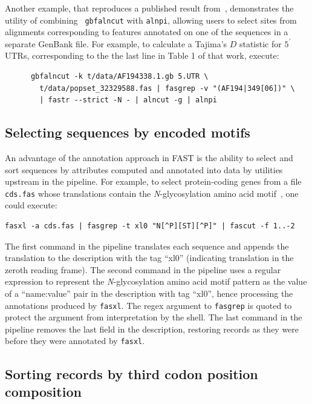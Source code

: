 \documentclass{frontiersSCNS} %
\newcommand{\fp}{$5^\prime${ }}
\begin{document}
Another example, that reproduces a published result
from~\citep{Ardell03}, demonstrates the utility of combining {\tt
  gbfalncut} with {\tt alnpi}, allowing users to select sites from
alignments corresponding to features annotated on one of the sequences
in a separate GenBank file. For example, to calculate a Tajima's $D$
statistic for \fp UTRs, corresponding to the the last line in Table 1
of that work, execute:

\begin{verbatim}
      gbfalncut -k t/data/AF194338.1.gb 5.UTR \
        t/data/popset_32329588.fas | fasgrep -v "(AF194|349[06])" \
        | fastr --strict -N - | alncut -g | alnpi
\end{verbatim}

\subsection{Selecting sequences by encoded motifs }

An advantage of the annotation approach in FAST is the ability to
select and sort sequences by attributes computed and annotated into
data by utilities upstream in the pipeline. For example, to select
protein-coding genes from a file {\tt cds.fas} whose translations
contain the {\it N}-glycosylation amino acid
motif~\citep{KornfieldKornfield85}, one could execute:

\begin{verbatim}
fasxl -a cds.fas | fasgrep -t xl0 "N[^P][ST][^P]" | fascut -f 1..-2
\end{verbatim}
 
The first command in the pipeline translates each sequence and appends
the translation to the description with the tag ``xl0'' (indicating
translation in the zeroth reading frame). The second command in the
pipeline uses a regular expression to represent the {\it
  N}-glycosylation amino acid motif pattern as the value of a
``name:value'' pair in the description with tag ``xl0'', hence
processing the annotations produced by {\tt fasxl}. The regex argument
to {\tt fasgrep} is quoted to protect the argument from interpretation
by the shell. The last command in the pipeline removes the last field
in the description, restoring records as they were before they were
annotated by {\tt fasxl}.

\subsection{Sorting records by third codon position composition}
\end{document}

